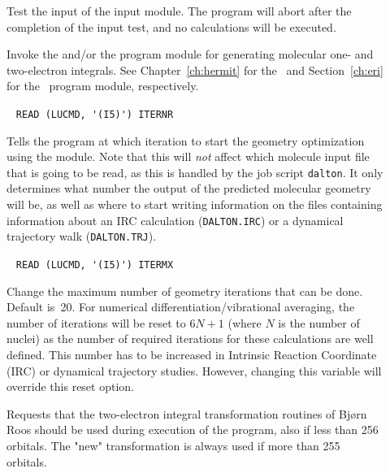 \begin{description}
\item[] Test the input of the  input
module. The program will abort after the completion of the input test,
and no calculations will be executed.

\item[] Invoke the {\her} and/or the {\eri} program module for generating molecular one-
and two-electron integrals.
See Chapter~\ref{ch:hermit} for the \her\ and
Section~\ref{ch:eri} for the \eri\ program module, respectively.

\item[]\verb| |\newline
\verb|READ (LUCMD, '(I5)') ITERNR|

Tells the program at which iteration to start the geometry optimization
using the  module.
Note that this will {\em not} affect which molecule
input file that is going to be read, as this is handled by the
job script {\tt dalton}. It only determines what number the
output of the predicted molecular geometry will be, as well as where to start
writing information on the files containing information about an IRC
calculation (\verb|DALTON.IRC|) or a dynamical trajectory walk (\verb|DALTON.TRJ|).

\item[]\verb| |\newline
\verb|READ (LUCMD, '(I5)') ITERMX|

Change the maximum number of geometry iterations
that can be done. Default
is~20.  For numerical
differentiation/vibrational averaging, the number of iterations will
be reset to $6N+1$ (where $N$ is the number of nuclei) as the number
of required iterations for these calculations are well
defined. This number has to be increased in Intrinsic Reaction Coordinate
(IRC) or dynamical
trajectory studies. However, changing this variable will override this reset
option.


\item[] Requests that the
two-electron integral transformation routines of Bj\o rn
Roos should be used during execution of the program, also if less than
256 orbitals. The "new" transformation is always used if more than 255
orbitals.


\end{description}
